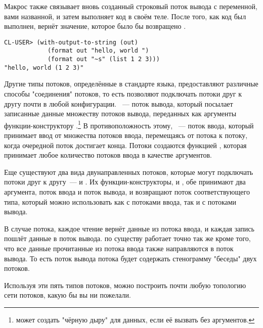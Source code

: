 Макрос  также связывает вновь созданный строковый поток вывода
с переменной, вами названной, и затем выполняет код в своём теле. После того, как код был
выполнен,  вернёт значение, которое было бы возвращено
.
 
\begin{lstlisting}
CL-USER> (with-output-to-string (out) 
            (format out "hello, world ") 
            (format out "~s" (list 1 2 3))) 
"hello, world (1 2 3)" 
\end{lstlisting}

Другие типы потоков, определённые в стандарте языка, предоставляют различные способы
"соединения" потоков, то есть позволяют подключать потоки друг к другу почти в любой
конфигурации. ~--- поток вывода, который посылает записанные данные
множеству потоков вывода, переданных как аргументы функции-конструктору
.\footnote{ может создать "чёрную
  дыру" для данных, если её вызвать без аргументов.} В противоположность этому,
~--- поток ввода, который принимает ввод от множества потоков
ввода, перемещаясь от потока к потоку, когда очередной поток достигает конца. Потоки
 создаются функцией , которая
принимает любое количество потоков ввода в качестве аргументов.

Еще существуют два вида двунаправленных потоков, которые могут подключать потоки друг к
другу~---  и . Их функции-конструкторы,
 и , обе принимают два аргумента, поток
ввода и поток вывода, и возвращают поток соответствующего типа, который можно использовать
как с потоками ввода, так и с потоками вывода.

В случае  потока, каждое чтение вернёт данные из потока ввода, и
каждая запись пошлёт данные в поток вывода.  по существу работает точно
так же кроме того, что все данные прочитанные из потока ввода также направляются в поток
вывода. То есть поток вывода потока  будет содержать стенограмму
"беседы" двух потоков.

Используя эти пять типов потоков, можно построить почти любую топологию сети потоков,
какую бы вы ни пожелали.

